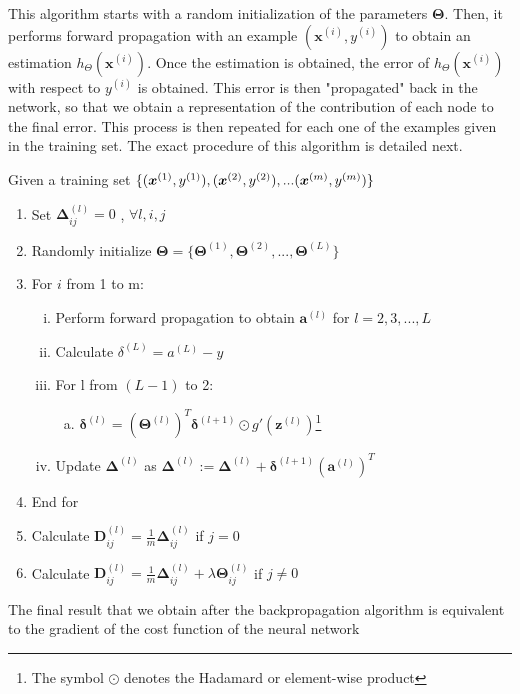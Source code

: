 \documentclass[a4paper, report, oneside, UKenglish]{memoir}
\DeclarePairedDelimiter{\set}{\lbrace}{\rbrace} %
\newcommand{\ba}{\boldsymbol{a}}
\newcommand{\bD}{\boldsymbol{D}}
\newcommand{\x}{\boldsymbol{x}}
\newcommand{\bz}{\boldsymbol{z}}
\newcommand{\bdelta}{\boldsymbol{\delta}}
\newcommand{\bDelta}{\boldsymbol{\Delta}}
\newcommand{\bTheta}{\boldsymbol{\Theta}}
\begin{document}
This algorithm starts with a random initialization of the parameters $\bTheta$. Then, it performs forward propagation with an example $(\x^{(i)}, y^{(i)})$ to obtain an estimation $h_\Theta(\x^{(i)})$. Once the estimation is obtained, the error of $h_\Theta(\x^{(i)})$ with respect to $y^{(i)}$ is obtained. This error is then "propagated" back in the network, so that we obtain a representation of the contribution of each node to the final error. This process is then repeated for each one of the examples given in the training set. The exact procedure of this algorithm is detailed next.

Given a training set $\set{(\x^{(1)}, y^{(1)}), (\x^{(2)}, y^{(2)}), ... (\x^{(m)}, y^{(m)})}$

\begin{enumerate}
    \item Set $\bDelta_{ij}^{(l)} = 0$ , $\forall l, i, j$
    \item Randomly initialize $\bTheta = \{\bTheta^{(1)}, \bTheta^{(2)}, ..., \bTheta^{(L)}\}$
    \item For $i$ from 1 to m:
    \begin{enumerate}[i.]
        \item Perform forward propagation to obtain $\ba ^{(l)}$ for $l=2, 3, ..., L$
        \item Calculate $\delta^{(L)} = a^{(L)} - y$
        \item For l from $(L-1)$ to 2:
        \begin{enumerate}[a.]
            \item $\bdelta^{(l)} = (\bTheta^{(l)})^T\bdelta^{(l+1)} \odot g'(\bz^{(l)})$\footnote{The symbol $\odot$ denotes the Hadamard or element-wise product}
        \end{enumerate}
        \item Update $\bDelta^{(l)}$ as $\bDelta^{(l)} := \bDelta^{(l)} + \bdelta^{(l+1)}(\ba^{(l)})^T$
    \end{enumerate}
    \item End for
    \item Calculate $\bD_{ij}^{(l)} = \frac{1}{m} \bDelta_{ij}^{(l)}$ if $j = 0$
    \item Calculate $\bD_{ij}^{(l)} = \frac{1}{m} \bDelta_{ij}^{(l)} + \lambda \bTheta_{ij}^{(l)}$ if $j \neq 0$
\end{enumerate}

The final result that we obtain after the backpropagation algorithm is equivalent to the gradient of the cost function of the neural network
\end{document}
